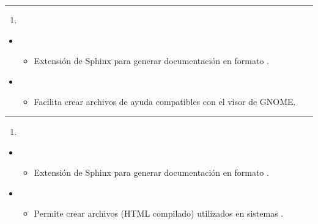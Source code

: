 \documentclass[a4paper,10pt,spanish]{sphinxmanual}
\begin{document}
\bigskip\hrule\bigskip

\begin{enumerate}
%
\setcounter{enumi}{32}
\item {} 
\sphinxAtStartPar
{}

\end{enumerate}
\begin{itemize}
\item {} 
\sphinxAtStartPar
{}
\begin{itemize}
\item {} 
\sphinxAtStartPar
Extensión de Sphinx para generar documentación en formato .

\end{itemize}

\item {} 
\sphinxAtStartPar
{}
\begin{itemize}
\item {} 
\sphinxAtStartPar
Facilita crear archivos de ayuda compatibles con el visor  de GNOME.

\end{itemize}

\end{itemize}


\bigskip\hrule\bigskip

\begin{enumerate}
%
\setcounter{enumi}{33}
\item {} 
\sphinxAtStartPar
{}

\end{enumerate}
\begin{itemize}
\item {} 
\sphinxAtStartPar
{}
\begin{itemize}
\item {} 
\sphinxAtStartPar
Extensión de Sphinx para generar documentación en formato .

\end{itemize}

\item {} 
\sphinxAtStartPar
{}
\begin{itemize}
\item {} 
\sphinxAtStartPar
Permite crear archivos  (HTML compilado) utilizados en sistemas .

\end{itemize}

\end{itemize}
\end{document}
